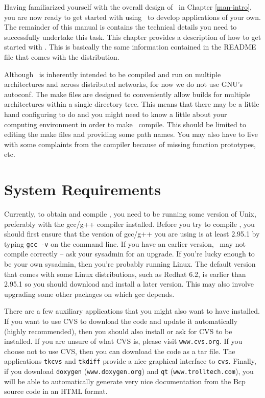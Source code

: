 
Having familiarized yourself with the overall design of \BB\ in
Chapter \ref{man-intro}, you are now ready to get started with using
\BB\ to develop applications of your own. The remainder of this manual
is contains the technical details you need to successfully undertake
this task. This chapter provides a description of how to get started
with \BB. This is basically the same information contained in the
README file that comes with the distribution.

Although \BB\ is inherently intended to be compiled and run on
multiple architectures and across distributed networks, for now we do not
use GNU's autoconf. The make files are designed to conveniently
allow builds for multiple architectures within a single directory
tree. This means that there may be a little hand configuring to do and you
might need to know a little about your computing environment in order
to make \BB\ compile. This should be limited to editing the make files
and providing some path names. You may also have to live with some
complaints from the compiler because of missing function prototypes,
etc.

\section{System Requirements}

Currently, to obtain and compile \BB, you need to be running some
version of Unix, preferably with the gcc/g++ compiler installed.
Before you try to compile \BB, you should first ensure that the
version of gcc/g++ you are using is at least 2.95.1 by typing {\tt gcc -v}
on the command line. If you have an earlier version, \BB\ may not
compile correctly -- ask your sysadmin for an upgrade. If you're lucky
enough to be your own sysadmin, then you're probably running Linux.
The default version that comes with some Linux distributions, such as
Redhat 6.2, is earlier than 2.95.1 so you should download and install a later
version. This may also involve upgrading some other packages on which
gcc depends.

There are a few auxiliary applications that you might also want to
have installed. If you want to use CVS to download the code and update
it automatically (highly recommended), then you should also install or
ask for CVS to be installed. If you are unsure of what CVS is, please
visit {\tt www.cvs.org}. If you choose not to use CVS, then
you can download the code as a tar file. The applications {\tt tkcvs} and 
{\tt tkdiff} provide a nice graphical interface to {\tt cvs}. Finally, if
you download {\tt doxygen} ({\tt www.doxygen.org}) and {\tt qt} 
({\tt www.trolltech.com}), you will be able to automatically generate very
nice documentation from the Bcp source code in an HTML format.

